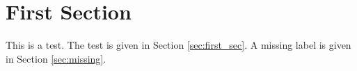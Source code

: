 \documentclass{article}
\begin{document}
\section{First Section\label{sec:first_sec}}
This is a test. 
The test is given in Section \ref{sec:first_sec}.
A missing label is given in Section \ref{sec:missing}.

\end{document}
